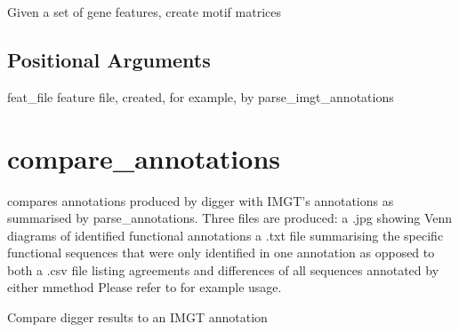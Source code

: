 \documentclass[letterpaper,10pt,english]{sphinxmanual}
\begin{document}
\sphinxAtStartPar

\sphinxAtStartPar
Given a set of gene features, create motif matrices


\begin{sphinxVerbatim}[commandchars=\\\{\}]
  \PYG{p}{[}\PYG{p}{]} 
\end{sphinxVerbatim}


\subsection{Positional Arguments}
\label{\detokenize{tools/calc_motifs:positional-arguments}}\begin{optionlist}{3cm}
\item [feat\_file]  
\sphinxAtStartPar
feature file, created, for example, by parse\_imgt\_annotations
\end{optionlist}

\sphinxstepscope


\section{compare\_annotations}
\label{\detokenize{tools/compare_annotations:compare-annotations}}\label{\detokenize{tools/compare_annotations:id1}}\label{\detokenize{tools/compare_annotations::doc}}
\sphinxAtStartPar
{} compares annotations produced by digger with IMGT’s annotations as summarised by parse\_annotations. Three files are produced:
\sphinxhyphen{} a .jpg showing Venn diagrams of identified functional annotations
\sphinxhyphen{} a .txt file summarising the specific functional sequences that were only identified in one annotation as opposed to both
\sphinxhyphen{} a .csv file listing agreements and differences of all sequences annotated by either mmethod
Please refer to {\hyperref[\detokenize{examples/human_igh:human-igh}]{}} for example usage.

\sphinxAtStartPar

\sphinxAtStartPar
Compare digger results to an IMGT annotation


\begin{sphinxVerbatim}[commandchars=\\\{\}]
  \PYG{p}{[}\PYG{p}{]} \PYG{p}{[}\PYG{p}{]} \PYG{p}{[} \PYG{p}{]} \PYG{p}{[} \PYG{p}{]}    
\end{sphinxVerbatim}
\end{document}
